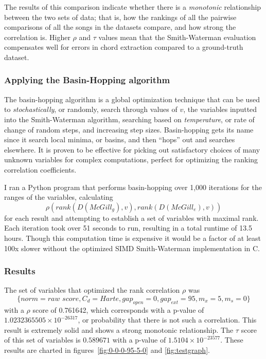 The results of this comparison indicate whether there is a \textit{monotonic} relationship between the two sets of data; that is, how the rankings of all the pairwise comparisons of all the songs in the datasets compare, and how strong the correlation is. Higher $\rho$ and $\tau$ values mean that the Smith-Waterman evaluation compensates well for errors in chord extraction compared to a ground-truth dataset.

\subsubsection{Applying the Basin-Hopping algorithm}

The basin-hopping algorithm\cite{wales1997global} is a global optimization technique that can be used to \textit{stochastically}, or randomly, search through values of $v$, the variables inputted into the Smith-Waterman algorithm, searching based on \textit{temperature}, or rate of change of random steps, and increasing step sizes. Basin-hopping gets its name since it search local minima, or basins, and then ``hops'' out and searches elsewhere. It is proven to be effective for picking out satisfactory choices of many unknown variables for complex computations, perfect for optimizing the ranking correlation coefficients.

I ran a Python program that performs basin-hopping over 1,000 iterations for the ranges of the variables, calculating \[\rho(rank(D({McGill}_{g}),v), rank(D({McGill}_{e}),v))\] for each result and attempting to establish a set of variables with maximal rank. Each iteration took over 51 seconds to run, resulting in a total runtime of 13.5 hours. Though this computation time is expensive it would be a factor of at least 100x slower without the optimized SIMD Smith-Waterman implementation in C.

\subsubsection{Results}

The set of variables that optimized the rank correlation $\rho$ was \[ \{norm=\textit{raw score}, C_d=Harte, {gap}_{open}=0, {gap}_{ext}=95, m_x=5, m_s=0\} \] with a $\rho$ score of 0.761642, which corresponds with a p-value of $1.0232365505\times 10^{-26317}$, or probability that there is not such a correlation. This result is extremely solid and shows a strong monotonic relationship. The $\tau$ score of this set of variables is $0.589671$ with a p-value of $1.5104 \times 10^{-23577}$. These results are charted in figures~\ref{fig:0-0-0-95-5-0} and \ref{fig:testgraph}.


